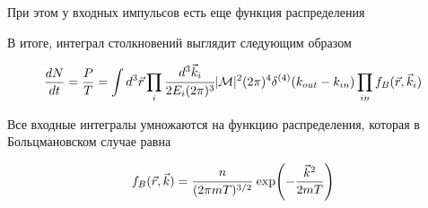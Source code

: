При этом у входных импульсов есть еще функция распределения

В итоге, интеграл столкновений выглядит следующим образом

\begin{equation*}
	\frac{dN}{dt} = \frac{P}{T} = \int d^3\vec{r} \prod_{i} \cfrac{d^3\vec{k}_i}{2 E_i (2\pi)^3} |\mathcal{M}|^2 (2\pi)^4 \delta^{(4)}(k_{out} - k_{in}) \prod_{in} f_B(\vec{r},\vec{k}_i)
\end{equation*}

Все входные интегралы умножаются на функцию распределения, которая в Больцмановском случае равна

\begin{equation*}
	f_B(\vec{r},\vec{k}) = \cfrac{n}{(2\pi mT)^{3/2}} \, \exp(-\frac{\vec{k}^2}{2mT})
\end{equation*}



